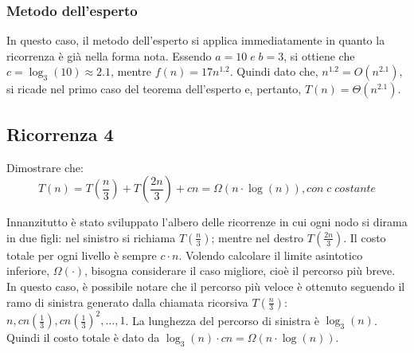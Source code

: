 \documentclass{article}
\begin{document}

\subsubsection{Metodo dell'esperto}
In questo caso, il metodo dell'esperto si applica immediatamente in quanto la ricorrenza è già nella forma nota. Essendo $a=10\;e\;b=3$, si ottiene che $c=\log_3(10) \approx 2.1$, mentre $f(n) = 17n^{1.2}$. Quindi dato che, $n^{1.2} = O(n^{2.1})$, si ricade nel primo caso del teorema dell'esperto e, pertanto, $T(n) = \Theta(n^{2.1})$.

\subsection{Ricorrenza 4}
Dimostrare che:
\begin{equation*}
    T(n) = T\left(\frac{n}{3}\right) + T\left(\frac{2n}{3}\right) + cn = \Omega(n\cdot \log(n)), con\;c\;costante
\end{equation*}

Innanzitutto è stato sviluppato l'albero delle ricorrenze in cui ogni nodo si dirama in due figli: nel sinistro si richiama $T\left(\frac{n}{3}\right)$; mentre nel destro $T\left(\frac{2n}{3}\right)$. Il costo totale per ogni livello è sempre $c\cdot n$. Volendo calcolare il limite asintotico inferiore, $\Omega(\cdot)$, bisogna considerare il caso migliore, cioè il percorso più breve. In questo caso, è possibile notare che il percorso più veloce è ottenuto seguendo il ramo di sinistra generato dalla chiamata ricorsiva $T\left(\frac{n}{3}\right)$: $n,cn\left(\frac{1}{3}\right), cn\left(\frac{1}{3}\right)^2 ,\dots, 1 $. La lunghezza del percorso di sinistra è $\log_3(n)$. Quindi il costo totale è dato da $\log_3(n)\cdot cn = \Omega(n\cdot\log(n))$.

\end{document}

